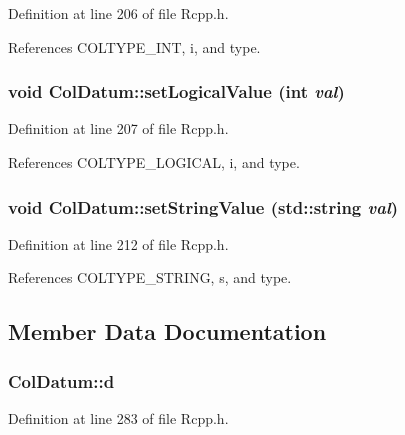 Definition at line 206 of file Rcpp.h.

References COLTYPE\_\-INT, i, and type.\hypertarget{classColDatum_19ebd9c0e3e2544c8679999ab91c9e20}{
\subsubsection[{setLogicalValue}]{\setlength{\rightskip}{0pt plus 5cm}void ColDatum::setLogicalValue (int {\em val})}}
\label{classColDatum_19ebd9c0e3e2544c8679999ab91c9e20}




Definition at line 207 of file Rcpp.h.

References COLTYPE\_\-LOGICAL, i, and type.\hypertarget{classColDatum_a87060ae6c415167d501c41684d8a586}{
\subsubsection[{setStringValue}]{\setlength{\rightskip}{0pt plus 5cm}void ColDatum::setStringValue (std::string {\em val})}}
\label{classColDatum_a87060ae6c415167d501c41684d8a586}




Definition at line 212 of file Rcpp.h.

References COLTYPE\_\-STRING, s, and type.

\subsection{Member Data Documentation}
\hypertarget{classColDatum_01a9fd53a56cf0cafa9c3230a3185c8c}{
\subsubsection[{d}]{ {\bf ColDatum::d}}}
\label{classColDatum_01a9fd53a56cf0cafa9c3230a3185c8c}




Definition at line 283 of file Rcpp.h.

